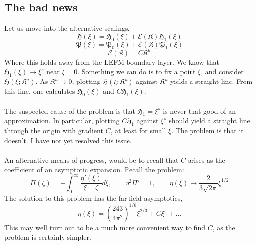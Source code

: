 \documentclass{article}
\newcommand{\cE}{\mathcal{E}}
\newcommand{\fP}{\mathfrak{P}}
\newcommand{\fH}{\mathfrak{H}}
\newcommand{\fK}{\mathfrak{K}}
\begin{document}
\subsection*{The bad news}
Let us move into the alternative scalings.
\[ \fH(\xi) = \fH_0(\xi) + \cE(\fK)\fH_1(\xi) \]
\[ \fP(\xi) = \fP_0(\xi) + \cE(\fK)\fP_1(\xi) \]
\[ \cE(\fK) = C \fK^u\]
Where this holds away from the LEFM boundary layer. We know that
$\fH_1(\xi) \to \xi^{s}$ near $\xi = 0$. Something we can do is to fix a point
$\xi$, and consider $\fH(\xi ; \fK^u)$. As $\fK^u \to 0$, plotting 
$\fH(\xi ; \fK^u)$ against $\fK^u$ yields a straight line. 
From this line, one calculates $\fH_0(\xi)$ and $C\fH_1(\xi)$.
\\
\\
The suspected cause of the problem is that $\fH_1 = \xi^s$ is never that
good of an approximation. In particular, plotting $C\fH_1$ against 
$\xi^s$ should yield a straight line through the origin with gradient $C$,
at least for small $\xi$. The problem is that it doesn't. I have not yet
resolved this issue. 
\\
\\
An alternative means of progress, would be to recall that $C$ arises
as the coefficient of an asymptotic expansion. Recall the problem:
\[ \Pi(\zeta) = -\int_0^{\infty}\frac{\eta'(\xi)}{\xi - \zeta} d\xi, \qquad
\eta^2 \Pi'=1, \qquad \eta(\xi) \to \frac{2}{3\sqrt{2\pi}}\xi^{1/2} \]
The solution to this problem has the far field asymptotics,
\[ \eta(\xi) = \left(\frac{243}{4\pi^2}\right)^{1/6} \xi^{2/3} 
+ C \xi^s + \dots \]
This may well turn out to be a much more convenient way to find $C$, as
the problem is certainly simpler.
%
%
%
%
%
%
\end{document}
